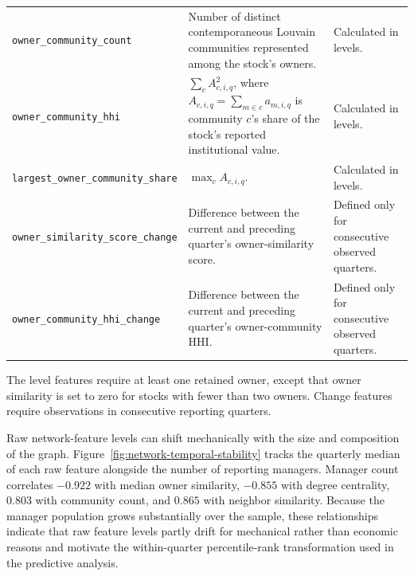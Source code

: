 \begin{longtable}{>{\raggedright\arraybackslash}p{}>{\raggedright\arraybackslash}p{}>{\raggedright\arraybackslash}p{}}
        \nolinkurl{owner_community_count}
                & Number of distinct contemporaneous Louvain communities represented among the stock's owners.
                & Calculated in levels.                                                                                                                                                                                                     \\
        \nolinkurl{owner_community_hhi}
                & $\sum_c A_{c,i,q}^2$, where $A_{c,i,q}=\sum_{m\in c}a_{m,i,q}$ is community $c$'s share of the stock's reported institutional value.
                & Calculated in levels.                                                                                                                                                                                                     \\
        \nolinkurl{largest_owner_community_share}
                & $\max_c A_{c,i,q}$.
                & Calculated in levels.                                                                                                                                                                                                     \\
        \nolinkurl{owner_similarity_score_change}
                & Difference between the current and preceding quarter's owner-similarity score.
                & Defined only for consecutive observed quarters.                                                                                                                                                                           \\
        \nolinkurl{owner_community_hhi_change}
                & Difference between the current and preceding quarter's owner-community HHI.
                & Defined only for consecutive observed quarters.                                                                                                                                                                           \\
\end{longtable}
\endgroup

\noindent
The level features require at least one retained owner, except that owner similarity is set to zero for stocks with fewer than two owners. Change features require observations in consecutive reporting quarters.

Raw network-feature levels can shift mechanically with the size and composition of the graph. Figure~\ref{fig:network-temporal-stability} tracks the quarterly median of each raw feature alongside the number of reporting managers. Manager count correlates $-0.922$ with median owner similarity, $-0.855$ with degree centrality, $0.803$ with community count, and $0.865$ with neighbor similarity. Because the manager population grows substantially over the sample, these relationships indicate that raw feature levels partly drift for mechanical rather than economic reasons and motivate the within-quarter percentile-rank transformation used in the predictive analysis.

